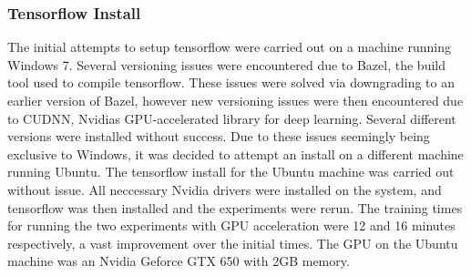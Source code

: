 \documentclass[12pt]{report}
\begin{document}
\subsubsection{Tensorflow Install}
\begin{flushleft}
The initial attempts to setup tensorflow were carried out on a machine running Windows 7. Several versioning issues were encountered due to Bazel, the build tool used to compile tensorflow. These issues were solved via downgrading to an earlier version of Bazel, however new versioning issues were then encountered due to CUDNN, Nvidias GPU-accelerated library for deep learning. Several different versions were installed without success. Due to these issues seemingly being exclusive to Windows, it was decided to attempt an install on a different machine running Ubuntu. The tensorflow install for the Ubuntu machine was carried out without issue. All neccessary Nvidia drivers were installed on the system, and tensorflow was then installed and the experiments were rerun. The training times for running the two experiments with GPU acceleration were 12 and 16 minutes respectively, a vast improvement over the initial times. The GPU on the Ubuntu machine was an Nvidia Geforce GTX 650 with 2GB memory.
\end{flushleft}
\end{document}
